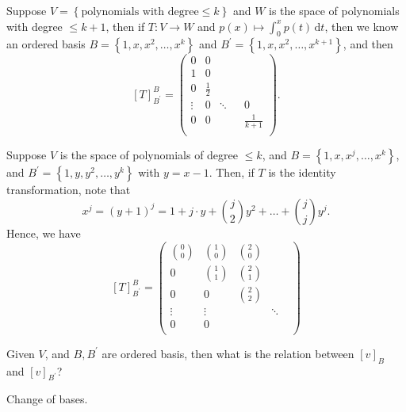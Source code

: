 \begin{eg}
    Suppose \(V = \left\{ \text{polynomials with degree} \le k \right\} \) and \(W\) is the space of polynomials with degree \(\le k + 1\), then if \(T: V \to W\) and \(p(x) \mapsto \int_{0}^{x} p(t) \, \mathrm{d} t \), then we know an ordered basis \(B = \left\{ 1, x, x^2,\dots , x^k  \right\} \) and \(B^{\prime} = \left\{ 1, x, x^2, \dots , x^{k+1} \right\} \), and then 
    \[
        [T]_{B^{\prime} }^B = \begin{pmatrix}
            0 & 0 &  &  &   \\
            1 & 0 &  &  &   \\
            0 & \frac{1}{2} &  &  &   \\
            \vdots  & 0 & \ddots &  & 0  \\
            0 & 0 &  &  &  \frac{1}{k+1} \\
        \end{pmatrix}.
    \]   
\end{eg}

\begin{eg}
    Suppose \(V\) is the space of polynomials of degree \(\le k\), and \(B = \left\{ 1, x, x^j, \dots , x^k \right\} \), and \(B^{\prime} = \left\{ 1, y, y^2, \dots , y^k \right\} \) with \(y = x-1\). Then, if \(T\) is the identity transformation, note that 
    \[
        x^j = (y + 1)^j = 1 + j \cdot y + \binom{j}{2} y^2 + \dots + \binom{j}{j} y^j. 
    \]
    Hence, we have 
    \[
        [T]_{B^{\prime} }^B = \left( \begin{array}{ccccc}
             \binom{0}{0} & \binom{1}{0} & \binom{2}{0} &  &   \\
             0& \binom{1}{1} & \binom{2}{1} &  &   \\
             0& 0 & \binom{2}{2} & &  \\
             \vdots& \vdots &  & \ddots  &  \\
             0& 0 &  &  &   \\
        \end{array} \right) 
    \]     
\end{eg}

\begin{question}
    Given \(V\), and \(B, B^{\prime} \) are ordered basis, then what is the relation between \([v]_B\) and \([v]_{B^{\prime} }\)?    
\end{question}
\begin{answer}
    Change of bases.
\end{answer}

